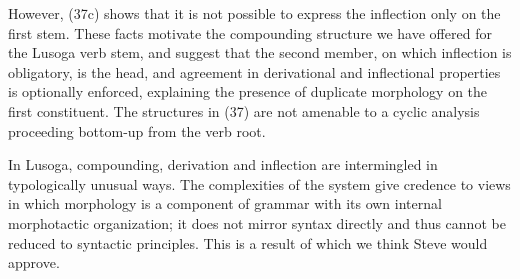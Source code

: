 \documentclass[output=paper,
modfonts
]{LSP/langsci}
\begin{document}
\noindent However, (37c) shows that it is not possible to express the inflection
only on the first stem. These facts motivate the compounding structure
we have offered for the Lusoga verb stem, and suggest that the second
member, on which inflection is obligatory, is the head, and agreement in
derivational and inflectional properties is optionally enforced,
explaining the presence of duplicate morphology on the first
constituent. The structures in (37) are not amenable to a cyclic
analysis proceeding bottom-up from the verb root.

In Lusoga, compounding, derivation and inflection are intermingled in
typologically unusual ways. The complexities of the system give credence
to views in which morphology is a component of grammar with its own
internal morphotactic organization; it does not mirror syntax directly
and thus cannot be reduced to syntactic principles. This is a result of
which we think Steve would approve.



\printbibliography[heading=subbibliography,notkeyword=this]
\end{document}
